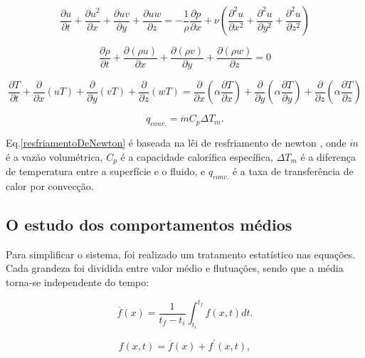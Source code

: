 \begin{equation}
  \frac{\partial u}{\partial t} + \frac{\partial u^2}{\partial x} + \frac{\partial uv}{\partial y} + \frac{\partial uw}{\partial z} = - \frac{1}{\rho} \frac{\partial {p}}{\partial x} + \nu \left( \frac{\partial^2 u}{\partial x^2} + \frac{\partial^2 u}{\partial y^2} + \frac{\partial^2 u}{\partial z^2}   \right)
\end{equation}

\begin{equation}
  \frac{\partial \rho}{\partial t} +  \frac{\partial (\rho u)}{\partial x} + \frac{\partial (\rho v)}{\partial y} + \frac{\partial (\rho w)}{\partial z} = 0
\end{equation}

\begin{equation}
  \frac{\partial T}{\partial t} + {\frac{\partial{}}{\partial{x}} (uT)} + {\frac{\partial{}}{\partial{y}} (vT)} + {\frac{\partial{}}{\partial{z}} (wT)}
  =
  {\frac{\partial{}}{\partial{x}}} \left(\alpha {\frac{\partial{T}}{\partial{x}}} \right) +
  {\frac{\partial{}}{\partial{y}}} \left(\alpha {\frac{\partial{T}}{\partial{y}}} \right) +
  {\frac{\partial{}}{\partial{z}}} \left(\alpha {\frac{\partial{T}}{\partial{z}}} \right)
\end{equation}

\begin{equation}\label{resfriamentoDeNewton}
  q_{conv.} = \dot{m} C_p \Delta T_m.
\end{equation}

Eq.\ref{resfriamentoDeNewton} é baseada na lêi de resfriamento de newton \cite{Incropera}, onde $\dot{m}$ é a vazão volumétrica, $C_p$ é a capacidade calorífica específica, $\Delta T_m$ é a diferença de temperatura entre a superfície e o fluido, e $q_{conv.}$ é a taxa de transferência de calor por convecção.

\subsection{O estudo dos comportamentos médios}
Para simplificar o sistema, foi realizado um tratamento estatístico nas equações. Cada grandeza foi dividida entre valor médio e flutuações, sendo que a média torna-se independente do tempo:

\begin{equation}
  \overline{f}({x})=\frac{1}{t_f - t_i} \int_{t_i}^{t_f} f({x} , t) dt.
\end{equation}

\begin{equation}
  f({x} , t) = \overline{f}({x}) + f^\prime ({x} ,t),
\end{equation}


